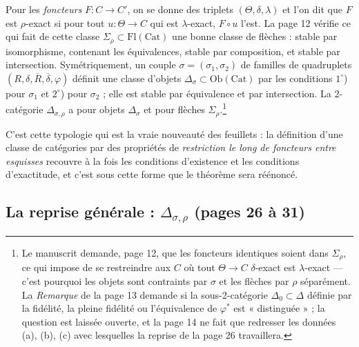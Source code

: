 \documentclass[11pt,a4paper]{article}
\begin{document}
Pour les \emph{foncteurs} $F : C \to C'$, on se donne des triplets
$(\Theta, \delta, \lambda)$ et l'on dit que $F$ est $\rho$-exact si pour tout
$u : \Theta \to C$ qui est $\lambda$-exact, $F \circ u$ l'est. La page 12
vérifie ce qui fait de cette classe $\Sigma_{\rho} \subset
\mathrm{Fl}(\mathrm{Cat})$ une bonne classe de flèches : stable par
isomorphisme, contenant les équivalences, stable par composition, et stable
par intersection. Symétriquement, un couple $\sigma = (\sigma_{1},
\sigma_{2})$ de familles de quadruplets $(R, \delta, \overline{R},
\overline{\delta}, \varphi)$ définit une classe d'objets $\Delta_{\sigma}
\subset \mathrm{Ob}(\mathrm{Cat})$ par les conditions $1^{\circ}$) pour
$\sigma_{1}$ et $2^{\circ}$) pour $\sigma_{2}$ ; elle est stable par
équivalence et par intersection. La 2-catégorie $\Delta_{\sigma,\rho}$ a
pour objets $\Delta_{\sigma}$ et pour flèches $\Sigma_{\rho}$.\footnote{Le
manuscrit demande, page 12, que les foncteurs identiques soient dans
$\Sigma_{\rho}$, ce qui impose de se restreindre aux $C$ où tout $\Theta
\to C$ $\delta$-exact est $\lambda$-exact — c'est pourquoi les objets sont
contraints par $\sigma$ et les flèches par $\rho$ séparément. La
\emph{Remarque} de la page 13 demande si la sous-2-catégorie $\Delta_{0}
\subset \Delta$ définie par la fidélité, la pleine fidélité ou
l'équivalence de $\varphi^{*}$ est « distinguée » ; la question est laissée
ouverte, et la page 14 ne fait que redresser les données (a), (b), (c) avec
lesquelles la reprise de la page 26 travaillera.}

C'est cette typologie qui est la vraie nouveauté des feuillets : la
définition d'une classe de catégories par des propriétés de
\emph{restriction le long de foncteurs entre esquisses} recouvre à la fois
les conditions d'existence et les conditions d'exactitude, et c'est sous
cette forme que le théorème sera réénoncé.

\subsection*{La reprise générale : $\Delta_{\sigma,\rho}$ (pages 26 à 31)}
\end{document}
